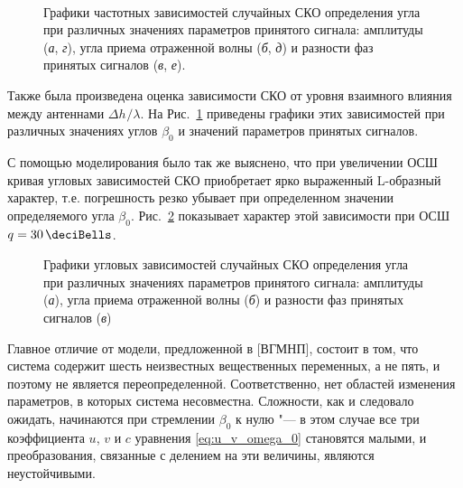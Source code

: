 \documentclass[../main.tex]{subfiles}
\begin{document}
\begin{figure}[hptb]
  \centering
  \\

  \caption{Графики частотных зависимостей случайных СКО определения угла при различных значениях параметров принятого сигнала: амплитуды (\textit{а}, \textit{г}), угла приема отраженной волны (\textit{б}, \textit{д}) и разности фаз принятых сигналов (\textit{в}, \textit{е}).}
  \label{fig:surface:pic3}
\end{figure}

Также была произведена оценка зависимости СКО от уровня взаимного влияния между антеннами $\Delta h^{}/\lambda$. На Рис.~\ref{fig:surface:pic3} приведены графики этих зависимостей при различных значениях углов $\beta_0$ и значений параметров принятых сигналов.

С помощью моделирования было так же выяснено, что при увеличении ОСШ кривая угловых зависимостей СКО приобретает ярко выраженный L-образный характер, т.е. погрешность резко убывает при определенном значении определяемого угла $\beta_0$. Рис.~\ref{fig:surface:pic4} показывает характер этой зависимости при ОСШ $q = \SI{30}{\deciBells}$.

\begin{figure}[hpbt]
  \centering

  \caption{Графики угловых зависимостей случайных СКО определения угла при различных значениях параметров принятого сигнала: амплитуды (\textit{а}), угла приема отраженной волны (\textit{б}) и разности фаз принятых сигналов (\textit{в})}
  \label{fig:surface:pic4}
\end{figure}

Главное отличие от модели, предложенной в [ВГМНП], состоит в том, что система содержит шесть неизвестных вещественных переменных, а не пять, и поэтому не является переопределенной. Соответственно, нет областей изменения параметров, в которых система несовместна. Сложности, как и следовало ожидать, начинаются при стремлении $\beta_0$ к нулю "--- в этом случае все три коэффициента $u$, $v$ и $c$ уравнения \eqref{eq:u_v_omega_0} становятся малыми, и преобразования, связанные с делением на эти величины, являются неустойчивыми.
\end{document}
